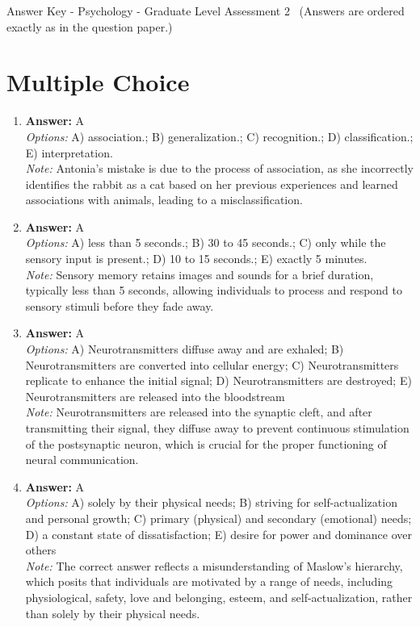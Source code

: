 \documentclass[12pt]{article}
\begin{document}
\begin{center}
Answer Key - Psychology - Graduate Level Assessment 2 \
\small (Answers are ordered exactly as in the question paper.)
\end{center}

\section*{Multiple Choice}
\begin{enumerate}[label=\arabic*.]
\item \textbf{Answer:} A
\\ \textit{Options:} A) association.; B) generalization.; C) recognition.; D) classification.; E) interpretation.
\\ \textit{Note:} Antonia's mistake is due to the process of association, as she incorrectly identifies the rabbit as a cat based on her previous experiences and learned associations with animals, leading to a misclassification.
\item \textbf{Answer:} A
\\ \textit{Options:} A) less than 5 seconds.; B) 30 to 45 seconds.; C) only while the sensory input is present.; D) 10 to 15 seconds.; E) exactly 5 minutes.
\\ \textit{Note:} Sensory memory retains images and sounds for a brief duration, typically less than 5 seconds, allowing individuals to process and respond to sensory stimuli before they fade away.
\item \textbf{Answer:} A
\\ \textit{Options:} A) Neurotransmitters diffuse away and are exhaled; B) Neurotransmitters are converted into cellular energy; C) Neurotransmitters replicate to enhance the initial signal; D) Neurotransmitters are destroyed; E) Neurotransmitters are released into the bloodstream
\\ \textit{Note:} Neurotransmitters are released into the synaptic cleft, and after transmitting their signal, they diffuse away to prevent continuous stimulation of the postsynaptic neuron, which is crucial for the proper functioning of neural communication.
\item \textbf{Answer:} A
\\ \textit{Options:} A) solely by their physical needs; B) striving for self-actualization and personal growth; C) primary (physical) and secondary (emotional) needs; D) a constant state of dissatisfaction; E) desire for power and dominance over others
\\ \textit{Note:} The correct answer reflects a misunderstanding of Maslow's hierarchy, which posits that individuals are motivated by a range of needs, including physiological, safety, love and belonging, esteem, and self-actualization, rather than solely by their physical needs.

\end{enumerate}
\end{document}
